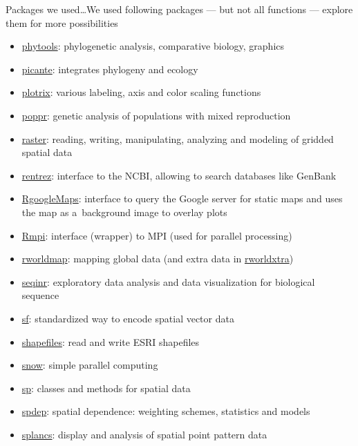 \documentclass[compress, xelatex, 11pt, xcolor=svgnames, aspectratio=169,
	hyperref={
		bookmarks=true,
		unicode=true,
		colorlinks=true,
		pdftitle={Molecular data in R},
		plainpages=false,
		pdfauthor={Vojtech Zeisek},
		pdfsubject={Course about phylogeny and evolution in R},
		pdfcreator={XeLaTeX},
		pdfkeywords={R, evolution, phylogeny, molecular data},
		linkcolor=Crimson, %
		anchorcolor=Magenta, %
		citecolor=Magenta, %
		filecolor=Magenta, %
		menucolor=Magenta, %
		urlcolor=DodgerBlue, %
		},
	url={hyphens, lowtilde} %
	]{beamer}
\begin{document}
\begin{frame}[allowframebreaks]{Packages we used\ldots}{We used following packages --- but not all functions --- explore them for more possibilities}
\begin{itemize}
		\item \href{https://CRAN.R-project.org/package=phytools}{phytools}: phylogenetic analysis, comparative biology, graphics
		\item \href{https://CRAN.R-project.org/package=picante}{picante}: integrates phylogeny and ecology
		\item \href{https://CRAN.R-project.org/package=plotrix}{plotrix}: various labeling, axis and color scaling functions
		\item \href{https://CRAN.R-project.org/package=poppr}{poppr}: genetic analysis of populations with mixed reproduction
		\item \href{https://CRAN.R-project.org/package=raster}{raster}: reading, writing, manipulating, analyzing and modeling of gridded spatial data
		\item \href{https://CRAN.R-project.org/package=rentrez}{rentrez}: interface to the NCBI, allowing to search databases like GenBank
		\item \href{https://CRAN.R-project.org/package=RgoogleMaps}{RgoogleMaps}: interface to query the Google server for static maps and uses the map as a~background image to overlay plots
		\item \href{https://CRAN.R-project.org/package=Rmpi}{Rmpi}: interface (wrapper) to MPI (used for parallel processing)
		\item \href{https://CRAN.R-project.org/package=rworldmap}{rworldmap}: mapping global data (and extra data in \href{https://CRAN.R-project.org/package=rworldxtra}{rworldxtra})
		\item \href{https://CRAN.R-project.org/package=seqinr}{seqinr}: exploratory data analysis and data visualization for biological sequence
		\item \href{https://CRAN.R-project.org/package=sf}{sf}: standardized way to encode spatial vector data
		\item \href{https://CRAN.R-project.org/package=shapefiles}{shapefiles}: read and write ESRI shapefiles
		\item \href{https://CRAN.R-project.org/package=snow}{snow}: simple parallel computing
		\item \href{https://CRAN.R-project.org/package=sp}{sp}: classes and methods for spatial data
		\item \href{https://CRAN.R-project.org/package=spdep}{spdep}: spatial dependence: weighting schemes, statistics and models
		\item \href{https://CRAN.R-project.org/package=splancs}{splancs}: display and analysis of spatial point pattern data

\end{itemize}
\end{frame}
\end{document}
